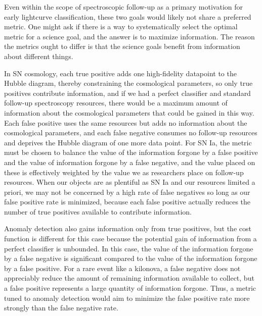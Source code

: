 Even within the scope of spectroscopic follow-up as a primary motivation for early lightcurve classification, these two goals would likely not share a preferred metric.
One might ask if there is a way to systematically select the optimal metric for a science goal, and the answer is to maximize information.
The reason the metrics ought to differ is that the science goals benefit from information about different things.

In SN cosmology, each true positive adds one high-fidelity datapoint to the Hubble diagram, thereby constraining the cosmological parameters, so only true positives contribute information, and if we had a perfect classifier and standard follow-up spectroscopy resources, there would be a maximum amount of information about the cosmological parameters that could be gained in this way.
Each false positive uses the same resources but adds no information about the cosmological parameters, and each false negative consumes no follow-up resources and deprives the Hubble diagram of one more data point.
For SN Ia, the metric must be chosen to balance the value of the information forgone by a false positive and the value of information forgone by a false negative, and the value placed on these is effectively weighted by the value we as researchers place on follow-up resources.
When our objects are as plentiful as SN Ia and our resources limited a priori, we may not be concerned by a high rate of false negatives so long as our false positive rate is minimized, because each false positive actually reduces the number of true positives available to contribute information.

Anomaly detection also gains information only from true positives, but the cost function is different for this case because the potential gain of information from a perfect classifier is unbounded.
In this case, the value of the information forgone by a false negative is significant compared to the value of the information forgone by a false positive.
For a rare event like a kilonova, a false negative does not appreciably reduce the amount of remaining information available to collect, but a false positive represents a large quantity of information forgone.
Thus, a metric tuned to anomaly detection would aim to minimize the false positive rate more strongly than the false negative rate.

%


